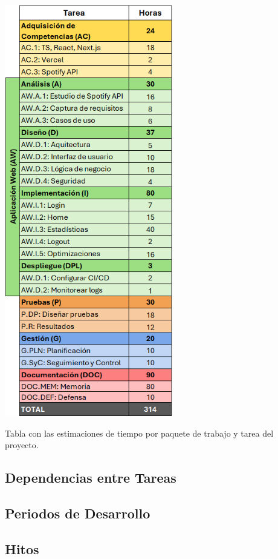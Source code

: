 \begin{table}[H]
    \centering
    \includegraphics[width=0.55\textwidth]{figures/estimaciones_tareas.png}
    \caption{Tabla con las estimaciones de tiempo por paquete de trabajo y tarea del proyecto.}
    \label{tab:estimaciones_tareas}
\end{table}

\subsection{Dependencias entre Tareas}
\subsection{Periodos de Desarrollo}
\subsection{Hitos}






